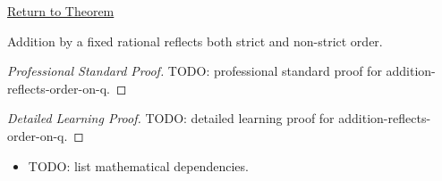 \newpage
{}
\label{prf:addition-reflects-order-on-q}

\begin{remark*}[Return]
\hyperref[cor:addition-reflects-order-on-q]{Return to Theorem}
\end{remark*}

\begin{corollary*}
Addition by a fixed rational reflects both strict and non-strict order.
\end{corollary*}

\begin{proof}[Professional Standard Proof]
\LRAProofBodyStart
TODO: professional standard proof for addition-reflects-order-on-q.
\end{proof}

\begin{proof}[Detailed Learning Proof]
\LRAProofBodyStart
TODO: detailed learning proof for addition-reflects-order-on-q.
\end{proof}

\begin{remark*}
\end{remark*}

\begin{dependencies}
\begin{itemize}
  \item TODO: list mathematical dependencies.
\end{itemize}
\end{dependencies}

\clearpage
